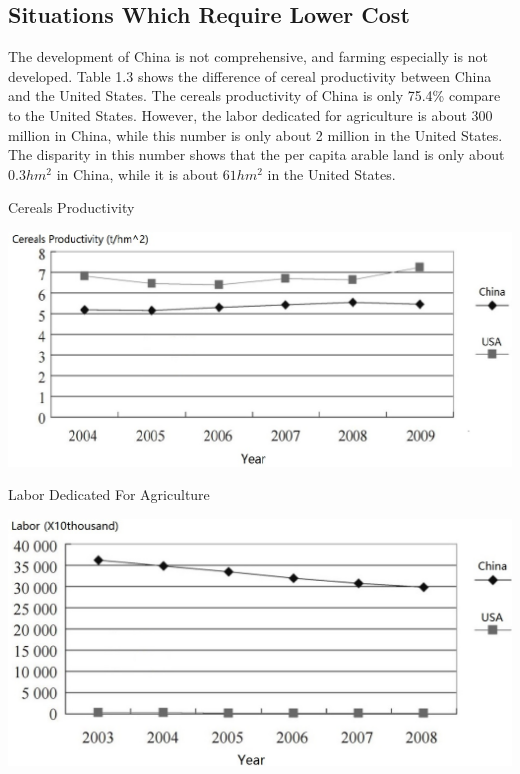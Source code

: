 \subsection{Situations Which Require Lower Cost}

The development of China is not comprehensive, and farming especially is not developed. Table 1.3 shows the difference of cereal productivity between China and the United States. The cereals productivity of China is only 75.4\% compare to the United States. However, the labor dedicated for agriculture is about 300 million in China, while this number is only about 2 million in the United States. The disparity in this number shows that the per capita arable land is only about $0.3 hm^{2}$ in China, while it is about $61 hm^{2}$ in the United States. \cite{tao2012}
\begin{table}[ht!]
\begin{center}
\caption{Cereals Productivity}
\includegraphics[scale = 0.45]{pics/tperhm.jpg}
\end{center}
\end{table}
\begin{table}[ht!]
\begin{center}
\caption{Labor Dedicated For Agriculture}
\includegraphics[scale = 0.45]{pics/10k.jpg}
\end{center}
\end{table}
